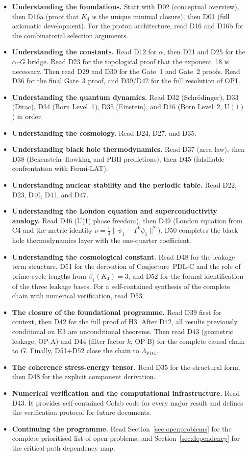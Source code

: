 \documentclass[11pt,a4paper]{article}
\theoremstyle{plain}
\theoremstyle{definition}
\theoremstyle{remark}
\begin{document}
\begin{itemize}
\item \textbf{Understanding the foundations.} Start with D02 (conceptual overview), then D16a (proof that $K_4$ is the unique minimal closure), then D01 (full axiomatic development). For the proton architecture, read D16 and D16b for the combinatorial selection arguments.
\item \textbf{Understanding the constants.} Read D12 for $\alpha$, then D21 and D25 for the $\alpha$--$G$ bridge. Read D23 for the topological proof that the exponent~18 is necessary. Then read D29 and D30 for the Gate~1 and Gate~2 proofs. Read D36 for the final Gate~3 proof, and D39/D42 for the full resolution of OP1.
\item \textbf{Understanding the quantum dynamics.} Read D32 (Schr\"odinger), D33 (Dirac), D34 (Born Level~1), D35 (Einstein), and D46 (Born Level~2, $\mathrm{U}(1)$) in order.
\item \textbf{Understanding the cosmology.} Read D24, D27, and D35.
\item \textbf{Understanding black hole thermodynamics.} Read D37 (area law), then D38 (Bekenstein--Hawking and PBH predictions), then D45 (falsifiable confrontation with Fermi-LAT).
\item \textbf{Understanding nuclear stability and the periodic table.} Read D22, D23, D40, D41, and D47.
\item \textbf{Understanding the London equation and superconductivity analogy.} Read D46 (U(1) phase freedom), then D49 (London equation from C4 and the metric identity $\nu = \tfrac{1}{4}\|\psi_1 - T^k\psi_1\|^2$). D50 completes the black hole thermodynamics layer with the one-quarter coefficient.
\item \textbf{Understanding the cosmological constant.} Read D48 for the leakage term structure, D51 for the derivation of Conjecture~PDL-C and the role of prime cycle lengths from $\beta_1(K_4)=3$, and D52 for the formal identification of the three leakage bases. For a self-contained synthesis of the complete chain with numerical verification, read D53.
\item \textbf{The closure of the foundational programme.} Read D39 first for context, then D42 for the full proof of H3. After D42, all results previously conditional on H3 are unconditional theorems. Then read D43 (geometric leakage, OP-A) and D44 (filter factor $k$, OP-B) for the complete causal chain to $G$. Finally, D51+D52 close the chain to $\Lambda_{\mathrm{PDL}}$.
\item \textbf{The coherence stress-energy tensor.} Read D35 for the structural form, then D48 for the explicit component derivation.
\item \textbf{Numerical verification and the computational infrastructure.} Read D43. It provides self-contained Colab code for every major result and defines the verification protocol for future documents.
\item \textbf{Continuing the programme.} Read Section~\ref{sec:openproblems} for the complete prioritised list of open problems, and Section~\ref{sec:dependency} for the critical-path dependency map.
\end{itemize}
\end{document}
